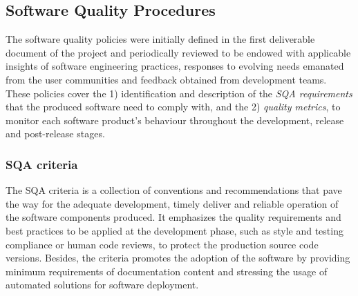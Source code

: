 \documentclass[journal]{IEEEtran}
\begin{document}
\subsection{Software Quality Procedures}
\label{subsec:sqa}

The software quality policies were initially defined in the first deliverable document of the
project \cite{indigo-d31} and periodically reviewed to be endowed with applicable insights of 
software engineering practices, responses to evolving needs emanated from the user communities and 
feedback obtained from development teams. These policies cover the 1) identification
and description of the \emph{SQA requirements} that the produced software need 
to comply with, and the 2) \emph{quality metrics}, to monitor each software product's 
behaviour throughout the development, release and post-release stages.

\subsubsection{SQA criteria}

The SQA criteria is a collection of conventions and recommendations that pave the way for
the adequate development, timely deliver and reliable operation of the software components
produced. It emphasizes the quality requirements and best practices to be applied at the
development phase, such as style and testing compliance or human code reviews, to protect the
production source code versions. Besides, the criteria promotes the adoption of the software 
by providing minimum requirements of documentation content and stressing the usage of automated
solutions for software deployment.
\end{document}
